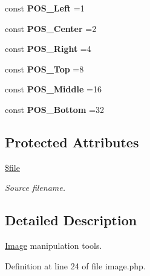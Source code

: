 {\bf }\par
\begin{DoxyCompactItemize}
\item 
\hypertarget{class_image_ab225040ebf6e263af6bbcd1499667e24}{}\label{class_image_ab225040ebf6e263af6bbcd1499667e24} 
const {\bfseries P\+O\+S\+\_\+\+Left} =1
\item 
\hypertarget{class_image_ae420359b7aab55c02b2165226f37b596}{}\label{class_image_ae420359b7aab55c02b2165226f37b596} 
const {\bfseries P\+O\+S\+\_\+\+Center} =2
\item 
\hypertarget{class_image_ab54804feab04fe8feb23d94849510922}{}\label{class_image_ab54804feab04fe8feb23d94849510922} 
const {\bfseries P\+O\+S\+\_\+\+Right} =4
\item 
\hypertarget{class_image_a8e891c95deb74e3fcf51bb8ee1827fb9}{}\label{class_image_a8e891c95deb74e3fcf51bb8ee1827fb9} 
const {\bfseries P\+O\+S\+\_\+\+Top} =8
\item 
\hypertarget{class_image_a339da37dd1c147d0db3947297e843d31}{}\label{class_image_a339da37dd1c147d0db3947297e843d31} 
const {\bfseries P\+O\+S\+\_\+\+Middle} =16
\item 
\hypertarget{class_image_a5bbbe1d9932acfbb292e8c76ff17b263}{}\label{class_image_a5bbbe1d9932acfbb292e8c76ff17b263} 
const {\bfseries P\+O\+S\+\_\+\+Bottom} =32
\end{DoxyCompactItemize}

\subsection*{Protected Attributes}
\begin{DoxyCompactItemize}
\item 
\hypertarget{class_image_aa1bfbd27060176201b271918dff57e8f}{}\label{class_image_aa1bfbd27060176201b271918dff57e8f} 
\hyperlink{class_image_aa1bfbd27060176201b271918dff57e8f}{\$file}
\begin{DoxyCompactList}\small\item\em Source filename. \end{DoxyCompactList}\end{DoxyCompactItemize}


\subsection{Detailed Description}
\hyperlink{class_image}{Image} manipulation tools. 

Definition at line 24 of file image.\+php.



